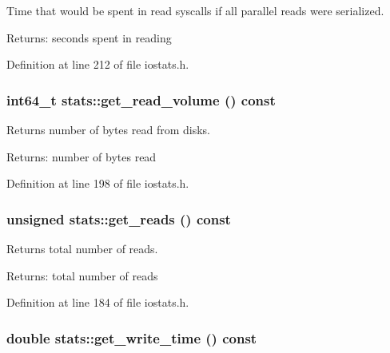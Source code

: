 Time that would be spent in read syscalls if all parallel reads were serialized. 

\begin{Desc}
\item[Returns:]seconds spent in reading \end{Desc}


Definition at line 212 of file iostats.h.\hypertarget{group__iolayer_g32d9c7436d0728f59ce53c269484ced3}{
\subsubsection[{get\_\-read\_\-volume}]{\setlength{\rightskip}{0pt plus 5cm}int64\_\-t stats::get\_\-read\_\-volume () const}}
\label{group__iolayer_g32d9c7436d0728f59ce53c269484ced3}


Returns number of bytes read from disks. 

\begin{Desc}
\item[Returns:]number of bytes read \end{Desc}


Definition at line 198 of file iostats.h.\hypertarget{group__iolayer_g6263716c232b9ebe0936f34fd25dd8d4}{
\subsubsection[{get\_\-reads}]{\setlength{\rightskip}{0pt plus 5cm}unsigned stats::get\_\-reads () const}}
\label{group__iolayer_g6263716c232b9ebe0936f34fd25dd8d4}


Returns total number of reads. 

\begin{Desc}
\item[Returns:]total number of reads \end{Desc}


Definition at line 184 of file iostats.h.\hypertarget{group__iolayer_g38c56edfce29a67fc2312dd2d012caaa}{
\subsubsection[{get\_\-write\_\-time}]{\setlength{\rightskip}{0pt plus 5cm}double stats::get\_\-write\_\-time () const}}
\label{group__iolayer_g38c56edfce29a67fc2312dd2d012caaa}


